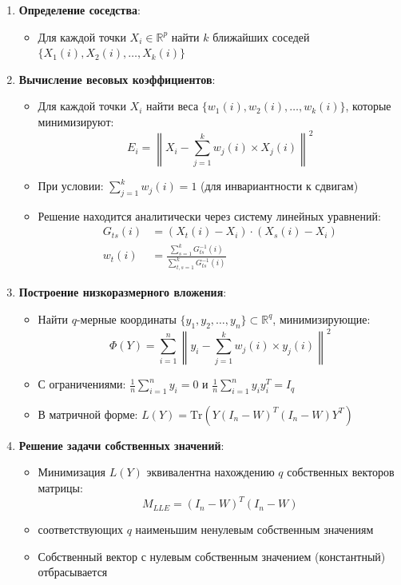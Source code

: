 \documentclass[a4paper,12pt]{article}
\begin{document}
\begin{enumerate}
    \item \textbf{Определение соседства}:
    \begin{itemize}
        \item Для каждой точки $X_i \in \mathbb{R}^p$ найти $k$ ближайших соседей $\{X_1(i), X_2(i), \ldots, X_k(i)\}$
    \end{itemize}
    
    \item \textbf{Вычисление весовых коэффициентов}:
    \begin{itemize}
        \item Для каждой точки $X_i$ найти веса $\{w_1(i), w_2(i), \ldots, w_k(i)\}$, которые минимизируют:
        \begin{equation}
            E_i = \left\|X_i - \sum_{j=1}^k w_j(i) \times X_j(i)\right\|^2
        \end{equation}
        \item При условии: $\sum_{j=1}^k w_j(i) = 1$ (для инвариантности к сдвигам)
        \item Решение находится аналитически через систему линейных уравнений:
        \begin{align}
            G_{ts}(i) &= (X_t(i) - X_i) \cdot (X_s(i) - X_i) \\
            w_t(i) &= \frac{\sum_{s=1}^k G_{ts}^{-1}(i)}{\sum_{t,s=1}^k G_{ts}^{-1}(i)}
        \end{align}
    \end{itemize}
    
    \item \textbf{Построение низкоразмерного вложения}:
    \begin{itemize}
        \item Найти $q$-мерные координаты $\{y_1, y_2, \ldots, y_n\} \subset \mathbb{R}^q$, минимизирующие:
        \begin{equation}
            \Phi(Y) = \sum_{i=1}^n \left\|y_i - \sum_{j=1}^k w_j(i) \times y_j(i)\right\|^2
        \end{equation}
        \item С ограничениями: $\frac{1}{n}\sum_{i=1}^n y_i = 0$ и $\frac{1}{n}\sum_{i=1}^n y_i y_i^T = I_q$
        \item В матричной форме: $L(Y) = \text{Tr}(Y(I_n-W)^T(I_n-W)Y^T)$
    \end{itemize}
    
    \item \textbf{Решение задачи собственных значений}:
    \begin{itemize}
        \item Минимизация $L(Y)$ эквивалентна нахождению $q$ собственных векторов матрицы:
        \begin{equation}
            M_{LLE} = (I_n-W)^T(I_n-W)
        \end{equation}
        \item соответствующих $q$ наименьшим ненулевым собственным значениям
        \item Собственный вектор с нулевым собственным значением (константный) отбрасывается
    \end{itemize}
\end{enumerate}
\end{document}
